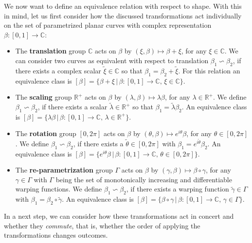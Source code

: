 We now want to define an equivalence relation with respect to shape.
With this in mind, let us first consider how the discussed transformations act
individually on the set of parametrized planar curves with complex
representation $\beta : [0,1]
\rightarrow \mathbb{C}$:
\begin{itemize}
  \item
    The \textbf{translation} group $\mathbb{C}$ acts on $\beta$ by $(\xi, \beta)
    \mapsto \beta + \xi$, for any $\xi \in \mathbb{C}$.
    We can consider two curves as equivalent with respect to translation
    $\beta_1 \backsim \beta_2$, if there exists a complex scalar $\tilde\xi \in
    \mathbb{C}$ so that $\beta_1 = \beta_2  + \tilde\xi$.
    For this relation an equivalence class is $[\beta] = \{\beta + \xi\, |\,
    \beta : [0,1] \rightarrow \mathbb{C},\, \xi \in \mathbb{C}\}$.
  \item 
    The \textbf{scaling} group $\mathbb{R}^+$ acts on $\beta$ by $(\lambda, \beta)
    \mapsto \lambda \beta$, for any $\lambda \in \mathbb{R}^+$.
    We define $\beta_1 \backsim \beta_2$, if there exists a scalar
    $\tilde\lambda \in \mathbb{R}^+$ so that $\beta_1 = \tilde\lambda \beta_2$.
    An equivalence class is $[\beta] = \{\lambda\beta\,|\,\beta : [0,1]
    \rightarrow \mathbb{C},\, \lambda \in \mathbb{R}^+\}$.
  \item 
    The \textbf{rotation} group $[0,2\pi]$ acts on $\beta$ by $(\theta, \beta)
    \mapsto e^{i\theta} \beta$, for any $\theta \in [0,2\pi]$.
    We define $\beta_1 \backsim \beta_2$, if there exists a $\tilde\theta \in
    [0,2\pi]$ with $\beta_1 = e^{i\tilde\theta} \beta_2$.
    An equivalence class is $[\beta] = \{e^{i\theta}\beta\,|\, \beta : [0,1]
    \rightarrow \mathbb{C},\, \theta \in [0,2\pi]\}$.
  \item 
    The \textbf{re-parametrization} group $\Gamma$ acts on $\beta$ by $(\gamma,\beta)
    \mapsto \beta \circ \gamma$, for any $\gamma \in \Gamma$ with $\Gamma$
    being the set of monotonically increasing and differentiable warping
    functions.
    We define $\beta_1 \backsim \beta_2$, if there exists a warping function
    $\tilde\gamma \in \Gamma$ with $\beta_1 = \beta_2 \circ \tilde\gamma$.
    An equivalence class is $[\beta] = \{\beta \circ \gamma\,|\, \beta : [0,1]
    \rightarrow \mathbb{C},\, \gamma \in \Gamma\}$.
\end{itemize}
In a next step, we can consider how these transformations act in concert and
whether they \textit{commute}, that is, whether the order of applying the
transformations changes outcomes.

